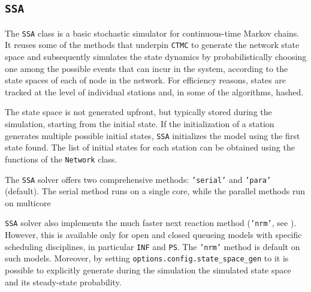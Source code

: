 \subsection{\texttt{SSA}}
The \texttt{SSA} class is a basic stochastic simulator for continuous-time Markov chains. It reuses some of the methods that underpin \texttt{CTMC} to generate the network state space and subsequently simulates the state dynamics by probabilistically choosing one among the possible events that can incur in the system, according to the state spaces of each of node in the network. For efficiency reasons, states are tracked at the level of individual stations and, in some of the algorithms, hashed. 

The state space is not generated upfront, but typically stored during the simulation, starting from the initial state. If the initialization of a station generates multiple possible initial states, \texttt{SSA} initializes the model using the first state found. The list of initial states for each station can be obtained using the  functions of the \texttt{Network} class.

The \texttt{SSA} solver offers two comprehensive methods: \texttt{'serial'} and \texttt{'para'} (default). The serial method runs on a single core, while the parallel methods run on multicore

\texttt{SSA} solver also implements the much faster next reaction method (\texttt{'nrm'}, see \cite{And07}). However, this is available only for open and closed queueing models with specific scheduling disciplines, in particular \texttt{INF} and \texttt{PS}. The \texttt{'nrm'} method is default on such models. Moreover, by setting \texttt{options.config.state\_space\_gen} to  it is possible to explicitly generate during the simulation the simulated state space and its steady-state probability.


